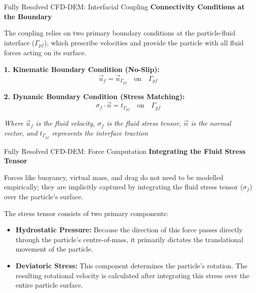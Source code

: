 \begin{frame}{Fully Resolved CFD-DEM: Interfacial Coupling}
    \textbf{Connectivity Conditions at the Boundary}
    \vspace{0.3cm}
    
    The coupling relies on two primary boundary conditions at the particle-fluid interface ($\Gamma_{pf}$), which prescribe velocities and provide the particle with all fluid forces acting on its surface.
    
    \vspace{0.3cm}
    \textbf{1. Kinematic Boundary Condition (No-Slip):}
    $$ \vec{u}_{f} = \vec{u}_{\Gamma_{pf}} \quad \text{on} \quad \Gamma_{pf} $$
    \vspace{0.1cm}
    
    \textbf{2. Dynamic Boundary Condition (Stress Matching):}
    $$ \sigma_{f} \cdot \vec{n} = t_{\Gamma_{pf}} \quad \text{on} \quad \Gamma_{pf} $$
    
    \vspace{0.3cm}
    \small{\textit{Where $\vec{u}_{f}$ is the fluid velocity, $\sigma_{f}$ is the fluid stress tensor, $\vec{n}$ is the normal vector, and $t_{\Gamma_{pf}}$ represents the interface traction}}
\end{frame}

\begin{frame}{Fully Resolved CFD-DEM: Force Computation}
    \textbf{Integrating the Fluid Stress Tensor}
    \vspace{0.3cm}
    
    Forces like buoyancy, virtual mass, and drag do not need to be modelled empirically; they are implicitly captured by integrating the fluid stress tensor ($\sigma_{f}$) over the particle's surface. 
    
    The stress tensor consists of two primary components:
    \begin{itemize}
        \item \textbf{Hydrostatic Pressure:} Because the direction of this force passes directly through the particle's centre-of-mass, it primarily dictates the translational movement of the particle.
        \item \textbf{Deviatoric Stress:} This component determines the particle's rotation. The resulting rotational velocity is calculated after integrating this stress over the entire particle surface.
    \end{itemize}
\end{frame}


